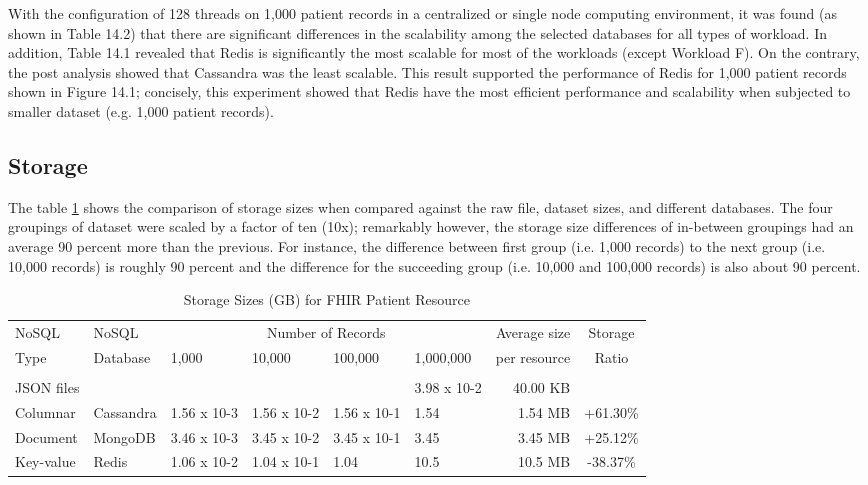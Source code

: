 \documentclass[5p]{elsarticle}
\begin{document}
With the configuration of 128 threads on 1,000 patient records in a centralized or single node computing environment, 
it was found (as shown in Table 14.2) that there are significant differences in the scalability among the selected databases for all types of workload.
In addition, Table 14.1 revealed that Redis is significantly the most scalable for most of the workloads (except Workload F). 
On the contrary, the post analysis showed that Cassandra was the least scalable. 
This result supported the performance of Redis for 1,000 patient records shown in Figure 14.1; 
concisely, this experiment showed that Redis have the most efficient performance and scalability when subjected to smaller dataset (e.g. 1,000 patient records). 

\subsection{Storage} 
The table \ref{table.storage} shows the comparison of storage sizes when compared against the raw file, dataset sizes, and different databases. 
The four groupings of dataset were scaled by a factor of ten (10x); 
remarkably however, the storage size differences of in-between groupings had an average 90 percent more than the previous. 
For instance, the difference between first group (i.e. 1,000 records) to the next group (i.e. 10,000 records) is roughly 90 percent and the difference
for the succeeding group (i.e. 10,000 and 100,000 records) is also about 90 percent. 


\begin{table}															
    \centering															
    \caption{Storage Sizes (GB) for FHIR Patient Resource}															
    \label{table.storage}															
    \begin{tabular}{llllllrc}   
        \toprule															
            NoSQL	&	NoSQL	&	\multicolumn{4}{c}{Number of Records}							&	Average size	&	Storage	\\
            Type	&	Database	&	1,000	&	10,000	&	100,000	&	1,000,000	&	per resource	&	Ratio	\\
        \hline	&		&		&		&		&		&		&		\\
            JSON files	&		&		&		&		&	 3.98 x 10-2	&	40.00 KB	&		\\
            Columnar	&	Cassandra	&	1.56 x 10-3	&	1.56 x 10-2	&	1.56 x 10-1	&	1.54	&	1.54 MB	&	+61.30\%	\\
            Document	&	MongoDB	&	3.46 x 10-3	&	3.45 x 10-2	&	3.45 x 10-1	&	3.45	&	3.45 MB	&	+25.12\%	\\
            Key-value	&	Redis	&	1.06 x 10-2	&	1.04 x 10-1	&	1.04	&	10.5	&	10.5 MB	&	-38.37\%	\\
        \hline
    \end{tabular}															
\end{table}															
\end{document}
